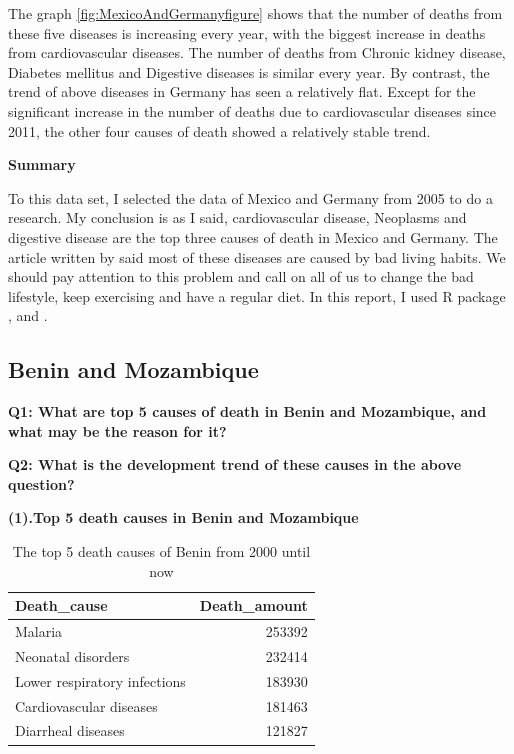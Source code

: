 \documentclass[11pt,a4paper,]{article}
\begin{document}
The graph \ref{fig:MexicoAndGermanyfigure} shows that the number of deaths from these five diseases is increasing every year, with the biggest increase in deaths from cardiovascular diseases. The number of deaths from Chronic kidney disease, Diabetes mellitus and Digestive diseases is similar every year. By contrast, the trend of above diseases in Germany has seen a relatively flat. Except for the significant increase in the number of deaths due to cardiovascular diseases since 2011, the other four causes of death showed a relatively stable trend.

\textbf{Summary}

To this data set, I selected the data of Mexico and Germany from 2005 to do a research. My conclusion is as I said, cardiovascular disease, Neoplasms and digestive disease are the top three causes of death in Mexico and Germany. The article written by \textcite{miller1997exercise} said most of these diseases are caused by bad living habits. We should pay attention to this problem and call on all of us to change the bad lifestyle, keep exercising and have a regular diet. In this report, I used R package \textcite{tidyverse}, \textcite{ggplot2} and \textcite{readr}.

\clearpage

\hypertarget{benin-and-mozambique}{%
\subsection{Benin and Mozambique}\label{benin-and-mozambique}}

\textbf{Q1: What are top 5 causes of death in Benin and Mozambique, and what may be the reason for it?}

\textbf{Q2: What is the development trend of these causes in the above question?}

\textbf{(1).Top 5 death causes in Benin and Mozambique}

\begin{table}

\caption{\label{tab:Benintopfivedeathrate}The top 5 death causes of Benin from 2000 until now}
\centering
\begin{tabular}[t]{l|r}
\hline
Death\_cause & Death\_amount\\
\hline
Malaria & 253392\\
\hline
Neonatal disorders & 232414\\
\hline
Lower respiratory infections & 183930\\
\hline
Cardiovascular diseases & 181463\\
\hline
Diarrheal diseases & 121827\\
\hline
\end{tabular}
\end{table}
\end{document}
